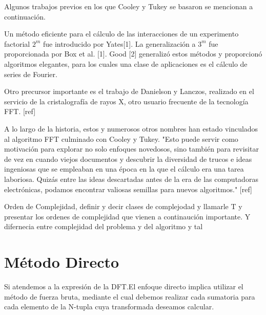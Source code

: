 \noindent Algunos trabajos previos en los que Cooley y Tukey se basaron se mencionan a continuación.

\noindent Un método eficiente para el cálculo de las interacciones de un experimento factorial $2^m$ fue introducido por Yates[1]. La generalización a $3^m$ fue proporcionada por Box et al. [1]. Good [2] generalizó estos métodos y proporcionó algoritmos elegantes, para los cuales una clase de aplicaciones es el cálculo de series de Fourier.

\noindent Otro precursor importante es el trabajo de Danielson y Lanczos, realizado en el servicio de la cristalografía de rayos X, otro usuario frecuente de la tecnología FFT. [ref]

\noindent A lo largo de la historia, estos y numerosos otros nombres han estado vinculados al algoritmo FFT culminado con Cooley y Tukey.
"Esto puede servir como motivación para explorar no solo enfoques novedosos, sino también para revisitar de vez en cuando viejos documentos y descubrir la diversidad de trucos e ideas ingeniosas que se empleaban en una época en la que el cálculo era una tarea laboriosa. Quizás entre las ideas descartadas antes de la era de las computadoras electrónicas, podamos encontrar valiosas semillas para nuevos algoritmos." [ref]

\begin{definicion}
    Orden de Complejidad, definir y decir clases de complejodad y llamarle T y presentar los ordenes de complejidad que vienen a continaución importante.
    Y difernecia entre complejidad del problema y del algoritmo y tal
\end{definicion}


\section{Método Directo}
Si atendemos a la expresión de la DFT.El enfoque directo implica utilizar el método de fuerza bruta, mediante el cual debemos realizar cada sumatoria para cada elemento de la N-tupla cuya transformada deseamos calcular.

